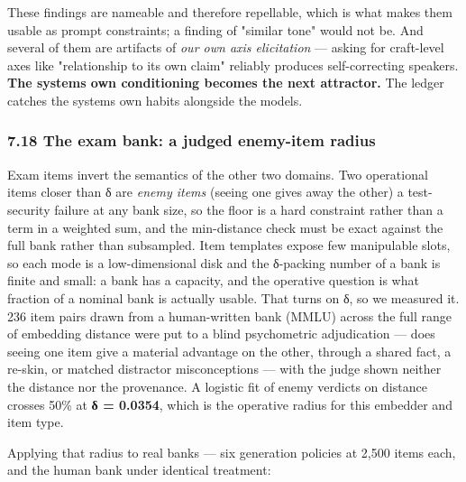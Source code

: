 \documentclass[
  10pt,
]{article}
\theoremstyle{plain}
\theoremstyle{definition}
\begin{document}
These findings are nameable and therefore repellable, which is what
makes them usable as prompt constraints; a finding of "similar tone"
would not be. And several of them are artifacts of \emph{our own axis
elicitation} --- asking for craft-level axes like "relationship to its
own claim" reliably produces self-correcting speakers. \textbf{The
system\textquotesingle s own conditioning becomes the next attractor.}
The ledger catches the system\textquotesingle s own habits alongside the
model\textquotesingle s.

\subsubsection{7.18 The exam bank: a judged enemy-item
radius}\label{718-the-exam-bank-a-judged-enemy-item-radius}

Exam items invert the semantics of the other two domains. Two
operational items closer than δ are \emph{enemy items} (seeing one gives
away the other) a test-security failure at any bank size, so the floor
is a hard constraint rather than a term in a weighted sum, and the
min-distance check must be exact against the full bank rather than
subsampled. Item templates expose few manipulable slots, so each mode is
a low-dimensional disk and the δ-packing number of a bank is finite and
small: a bank has a capacity, and the operative question is what
fraction of a nominal bank is actually usable. That turns on δ, so we
measured it. 236 item pairs drawn from a human-written bank (MMLU)
across the full range of embedding distance were put to a blind
psychometric adjudication --- does seeing one item give a material
advantage on the other, through a shared fact, a re-skin, or matched
distractor misconceptions --- with the judge shown neither the distance
nor the provenance. A logistic fit of enemy verdicts on distance crosses
50\% at \textbf{δ = 0.0354}, which is the operative radius for this
embedder and item type.

Applying that radius to real banks --- six generation policies at 2,500
items each, and the human bank under identical treatment:
\end{document}
